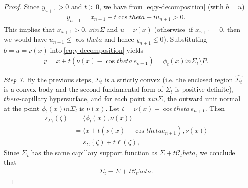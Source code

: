 \documentclass[10pt,a4paper]{amsart}
\newcommand{\Cth}{\cC_\theta}
\newcommand{\Si}{\Sigma}
\newcommand{\cC}{\mathcal{C}}
\newcommand{\eq}[1]{\begin{equation}\begin{alignedat}{2}#1\end{alignedat}\end{equation}}
\def\in{in }%
\def\theta{theta}%
\newcommand{\wh}{\widehat}
\begin{document}
\begin{proof}
Since $y_{n+1}>0$ and $t>0$, we have from \eqref{eq:y-decomposition} (with $b=u$)
\eq{
  y_{n+1}=x_{n+1}-t\cos\theta+tu_{n+1}>0.
}
This implies that $x_{n+1}>0$, $x\in \Si$ and $u=\nu(x)$ (otherwise, if $x_{n+1}=0$, then we would have $u_{n+1}\le \cos\theta$ and hence $y_{n+1}\le 0$).
Substituting $b=u=\nu(x)$ into \eqref{eq:y-decomposition} yields
\eq{
  y=x+t(\nu(x)-\cos\theta\,e_{n+1})=\phi_t(x)\in\Sigma_t\setminus P.
}

\emph{Step 7.} By the previous steps, $\Si_t$ is a strictly convex (i.e. the enclosed region $\wh{\Si_t}$ is a convex body and the second fundamental form of $\Si_t$ is positive definite), $\theta$-capillary hypersurface, and for each point $x\in \Sigma$, the outward unit normal at the point $\phi_t(x)\in\Sigma_t$ is $\nu(x)$. Let $\zeta=\nu(x)-\cos\theta\, e_{n+1}$. Then
\eq{
s_{\Sigma_t}(\zeta)&=\langle \phi_t(x),\nu(x)\rangle\\
&=\langle x+t(\nu(x)-\cos\theta e_{n+1}),\nu(x)\rangle\\
&=s_{\Sigma}(\zeta)+t\ell(\zeta),
}
Since $\Sigma_t$ has the same capillary support function as $\Sigma+t\Cth$, we conclude that
\eq{
  \Sigma_t=\Sigma+t\Cth.
}
\end{proof}
\end{document}
